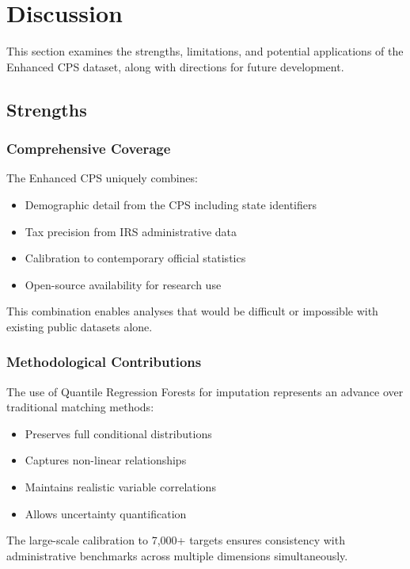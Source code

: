 \section{Discussion}

This section examines the strengths, limitations, and potential applications of the Enhanced CPS dataset, along with directions for future development.

\subsection{Strengths}

\subsubsection{Comprehensive Coverage}

The Enhanced CPS uniquely combines:
\begin{itemize}
\item Demographic detail from the CPS including state identifiers
\item Tax precision from IRS administrative data  
\item Calibration to contemporary official statistics
\item Open-source availability for research use
\end{itemize}

This combination enables analyses that would be difficult or impossible with existing public datasets alone.

\subsubsection{Methodological Contributions}

The use of Quantile Regression Forests for imputation represents an advance over traditional matching methods:
\begin{itemize}
\item Preserves full conditional distributions
\item Captures non-linear relationships
\item Maintains realistic variable correlations
\item Allows uncertainty quantification
\end{itemize}

The large-scale calibration to 7,000+ targets ensures consistency with administrative benchmarks across multiple dimensions simultaneously.

